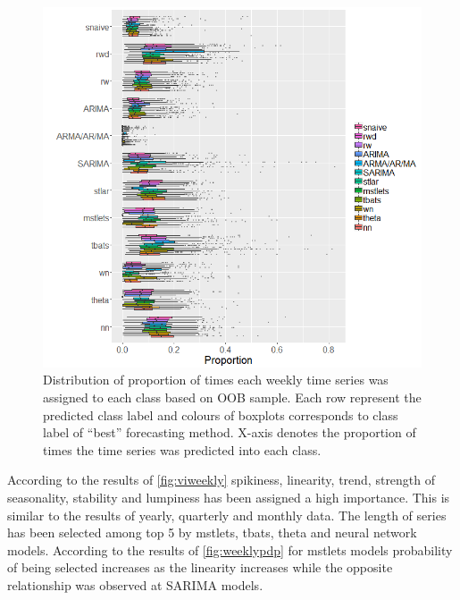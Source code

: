\documentclass[11pt,a4paper,]{article}
\begin{document}
\begin{figure}
\centering
\includegraphics{figures/oobweekly-1.png}
\caption{\label{fig:oobweekly}Distribution of proportion of times each
weekly time series was assigned to each class based on OOB sample. Each
row represent the predicted class label and colours of boxplots
corresponds to class label of ``best'' forecasting method. X-axis
denotes the proportion of times the time series was predicted into each
class.}
\end{figure}

\clearpage

According to the results of \autoref{fig:viweekly} spikiness, linearity,
trend, strength of seasonality, stability and lumpiness has been
assigned a high importance. This is similar to the results of yearly,
quarterly and monthly data. The length of series has been selected among
top 5 by mstlets, tbats, theta and neural network models. According to
the results of \autoref{fig:weeklypdp} for mstlets models probability of
being selected increases as the linearity increases while the opposite
relationship was observed at SARIMA models.
\end{document}
